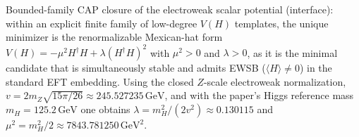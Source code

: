 \noindent Bounded-family CAP closure of the electroweak scalar potential (interface): within an explicit finite family of low-degree $V(H)$ templates, the unique minimizer is the renormalizable Mexican-hat form $V(H)=-\mu^2 H^\dagger H+\lambda (H^\dagger H)^2$ with $\mu^2>0$ and $\lambda>0$, as it is the minimal candidate that is simultaneously stable and admits EWSB ($\langle H\rangle\neq 0$) in the standard EFT embedding. Using the closed $Z$-scale electroweak normalization, $v=2m_Z\sqrt{15\pi/26}\approx 245.527235\,\mathrm{GeV}$, and with the paper's Higgs reference mass $m_H=125.2\,\mathrm{GeV}$ one obtains $\lambda=m_H^2/(2v^2)\approx 0.130115$ and $\mu^2=m_H^2/2\approx 7843.781250\,\mathrm{GeV}^2$.